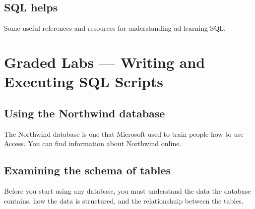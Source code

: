 \documentclass{article}
\begin{document}
        \subsection{SQL helps}
Some useful references and resources for understanding ad learning SQL.

    \section{Graded Labs --- Writing and Executing SQL Scripts}


        \subsection{Using the Northwind database}
The Northwind database is one that Microsoft used to train people how to use Access. You can find information about Northwind online.
        \subsection{Examining the schema of tables}
       Before you start using any database, you must understand the data the database contains, how the data is structured, and the relationshuip between the tables. 
\end{document}

